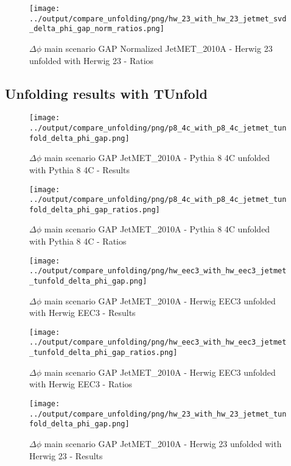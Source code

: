 \documentclass[11pt]{book}
\begin{document}
\begin{figure}[ht]
\centering
\texttt{[image: ../output/compare\_unfolding/png/hw\_23\_with\_hw\_23\_jetmet\_svd\_delta\_phi\_gap\_norm\_ratios.png]}
\caption{$\Delta\phi$ main scenario GAP Normalized JetMET\_2010A - Herwig 23 unfolded with Herwig 23 - Ratios}
\label{hw_23_hw_23_jetmet_svd_delta_phi_gap_norm_b}
\end{figure}




\clearpage
\subsection{Unfolding results with TUnfold}

\begin{figure}[ht]
\centering
\texttt{[image: ../output/compare\_unfolding/png/p8\_4c\_with\_p8\_4c\_jetmet\_tunfold\_delta\_phi\_gap.png]}
\caption{$\Delta\phi$ main scenario GAP JetMET\_2010A - Pythia 8 4C unfolded with Pythia 8 4C - Results}
\label{p8_p8_jetmet_tunfold_delta_phi_gap_a}
\end{figure}

\begin{figure}[ht]
\centering
\texttt{[image: ../output/compare\_unfolding/png/p8\_4c\_with\_p8\_4c\_jetmet\_tunfold\_delta\_phi\_gap\_ratios.png]}
\caption{$\Delta\phi$ main scenario GAP JetMET\_2010A - Pythia 8 4C unfolded with Pythia 8 4C - Ratios}
\label{p8_p8_jetmet_tunfold_delta_phi_gap_b}
\end{figure}

\begin{figure}[ht]
\centering
\texttt{[image: ../output/compare\_unfolding/png/hw\_eec3\_with\_hw\_eec3\_jetmet\_tunfold\_delta\_phi\_gap.png]}
\caption{$\Delta\phi$ main scenario GAP JetMET\_2010A - Herwig EEC3 unfolded with Herwig EEC3 - Results}
\label{hw_eec3_hw_eec3_jetmet_tunfold_delta_phi_gap_a}
\end{figure}

\begin{figure}[ht]
\centering
\texttt{[image: ../output/compare\_unfolding/png/hw\_eec3\_with\_hw\_eec3\_jetmet\_tunfold\_delta\_phi\_gap\_ratios.png]}
\caption{$\Delta\phi$ main scenario GAP JetMET\_2010A - Herwig EEC3 unfolded with Herwig EEC3 - Ratios}
\label{hw_eec3_hw_eec3_jetmet_tunfold_delta_phi_gap_b}
\end{figure}

\begin{figure}[ht]
\centering
\texttt{[image: ../output/compare\_unfolding/png/hw\_23\_with\_hw\_23\_jetmet\_tunfold\_delta\_phi\_gap.png]}
\caption{$\Delta\phi$ main scenario GAP JetMET\_2010A - Herwig 23 unfolded with Herwig 23 - Results}
\label{hw_23_hw_23_jetmet_tunfold_delta_phi_gap_a}
\end{figure}
\end{document}
